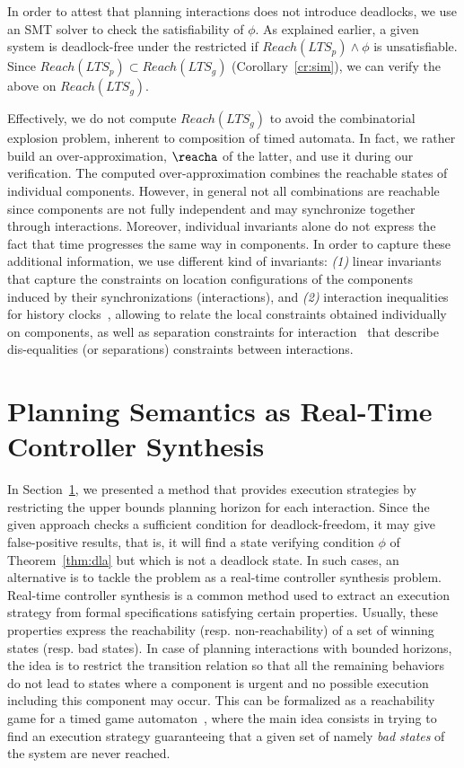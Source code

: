 In order to attest that planning interactions does not introduce deadlocks,
we use an SMT solver to check the satisfiability of $\phi$.
As explained earlier, a given system is deadlock-free under
the restricted \lpsabr if $Reach(LTS_p)\wedge\phi$ is unsatisfiable. Since
$Reach(LTS_p)\subset Reach(LTS_g)$ (Corollary~\ref{cr:sim}), we can verify the above on $Reach(LTS_g)$.

\noindent Effectively, we do not compute $Reach(LTS_g)$ to avoid the combinatorial explosion problem,
inherent to composition of timed automata. In fact, we rather build an over-approximation,
$\reacha$ of the latter, and use it during our verification.
The computed over-approximation combines the reachable states of individual components.
However, in general not all combinations are reachable since components are not fully independent 
and may synchronize together through interactions. Moreover, individual invariants alone do not
express the fact that time progresses the same way in components.
In order to capture these additional information, we use different kind of invariants:
\emph{(1)} linear invariants~\cite{inv-lin} that capture the constraints on location 
configurations of the components induced by their synchronizations (interactions), and
\emph{(2)} interaction inequalities for history
clocks~\cite{inv-comp}, allowing to relate the local constraints obtained individually on
components, as well as separation constraints for interaction~\cite{inv-comp} that describe
dis-equalities (or separations) constraints between interactions.

\section{Planning Semantics as Real-Time Controller Synthesis}
\label{sec5}

In Section~\ref{sec5}, we presented a method that provides execution strategies
by restricting the upper bounds planning horizon for each interaction.
Since the given approach checks a sufficient condition for deadlock-freedom,
it may give false-positive results, that is, it will find a state verifying condition
$\phi$ of Theorem~\ref{thm:dla}
but which is not a deadlock state. In such cases, an alternative is to tackle the problem
as a real-time controller synthesis problem.
Real-time controller synthesis is a common method used to extract an execution strategy from
formal specifications satisfying certain properties. Usually, these properties express the
reachability (resp. non-reachability) of a set of winning states (resp. bad states).
In case of planning interactions with bounded horizons, the idea is to restrict the transition relation so that all the remaining 
behaviors do not lead to states where a component is urgent and no possible execution
including this component may occur. This can be formalized as a reachability game for a timed
game automaton~\cite{tiga:alg}, where the main idea consists in trying to find an execution 
strategy guaranteeing that a given set of namely \emph{bad states} of the system are never
reached.

